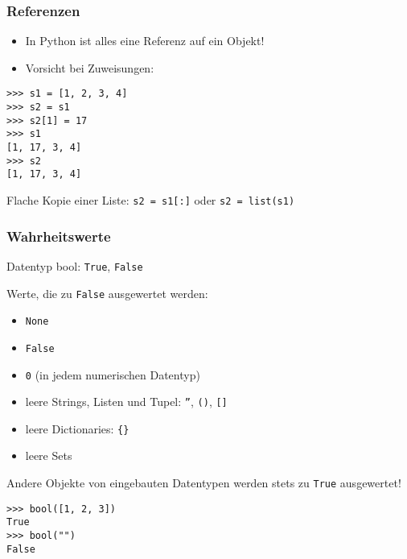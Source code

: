 \begin{frame}[fragile]
\frametitle{Referenzen}
\begin{itemize}
\item In Python ist alles eine Referenz auf ein Objekt!
\item Vorsicht bei Zuweisungen:
\end{itemize}
\begin{lstlisting}[style=Shell]
>>> s1 = [1, 2, 3, 4]
>>> s2 = s1
>>> s2[1] = 17
>>> s1
[1, 17, 3, 4]
>>> s2
[1, 17, 3, 4]
\end{lstlisting}
Flache Kopie einer Liste: \lstinline{s2 = s1[:]} oder \lstinline{s2 = list(s1)}
\end{frame}

\begin{frame}[fragile]
\frametitle{Wahrheitswerte}
Datentyp \alert{bool}: \texttt{True}, \texttt{False}

Werte, die zu \texttt{False} ausgewertet werden:
\begin{itemize}
\item \texttt{None}
\item \texttt{False}
\item \texttt{0} (in jedem numerischen Datentyp)
\item leere Strings, Listen und Tupel: \texttt{''}, \texttt{()}, \texttt{[]}
\item leere Dictionaries: \texttt{\{\}}
\item leere Sets
\end{itemize}
Andere Objekte von eingebauten Datentypen werden stets zu \texttt{True} ausgewertet!
\begin{lstlisting}[style=Shell]
>>> bool([1, 2, 3])
True
>>> bool("")
False
\end{lstlisting}
\end{frame}


